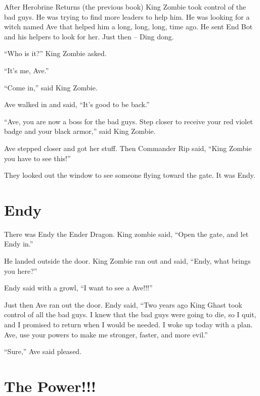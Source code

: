 \documentclass[12pt,twoside]{krantz}
\begin{document}
After Herobrine Returns (the previous book) King Zombie took control of
the bad guys. He was trying to find more leaders to help him. He was
looking for a witch named Ave that helped him a long, long, long, time
ago. He sent End Bot and his helpers to look for her. Just then -- Ding
dong.

``Who is it?'' King Zombie asked.

``It's me, Ave.''

``Come in,'' said King Zombie.

Ave walked in and said, ``It's good to be back.''

``Ave, you are now a boss for the bad guys. Step closer to receive your
red violet badge and your black armor,'' said King Zombie.

Ave stepped closer and got her stuff. Then Commander Rip said, ``King
Zombie you have to see this!''

They looked out the window to see someone flying toward the gate. It was
Endy.

\hypertarget{endy}{%
\section{Endy}\label{endy}}

There was Endy the Ender Dragon. King zombie said, ``Open the gate, and
let Endy in.''

He landed outside the door. King Zombie ran out and said, ``Endy, what
brings you here?''

Endy said with a growl, ``I want to see a Ave!!!''

Just then Ave ran out the door. Endy said, ``Two years ago King Ghast
took control of all the bad guys. I knew that the bad guys were going to
die, so I quit, and I promised to return when I would be needed. I woke
up today with a plan. Ave, use your powers to make me stronger, faster,
and more evil.''

``Sure,'' Ave said pleased.

\hypertarget{the-power}{%
\section{The Power!!!}\label{the-power}}
\end{document}
